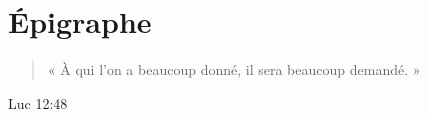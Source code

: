 \chapter*{Épigraphe}

\begin{quote}
« À qui l'on a beaucoup donné, il sera beaucoup demandé. »
\end{quote}

\begin{flushright}
Luc 12:48
\end{flushright}
